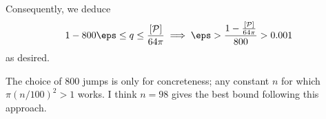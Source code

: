 \documentclass[11pt]{scrartcl}
\begin{document}
Consequently, we deduce
\[ 1 - 800\eps \le q \le \frac{[\mathcal P]}{64\pi}
  \implies \eps > \frac{1 - \frac{[\mathcal P]}{64\pi}}{800}
  > 0.001
\]
as desired.

\begin{remark*}
  The choice of $800$ jumps is only for concreteness;
  any constant $n$ for which $\pi(n/100)^2 > 1$ works.
  I think $n = 98$ gives the best bound following this approach.
\end{remark*}
\pagebreak
\end{document}
